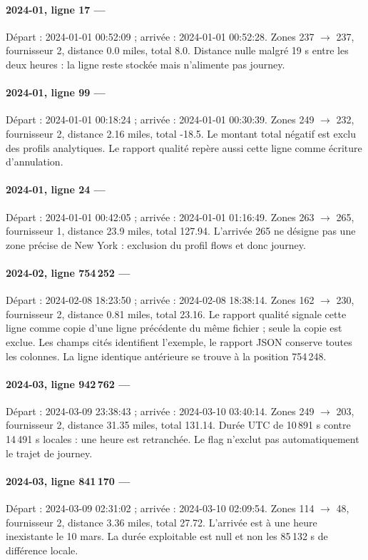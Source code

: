\paragraph{2024-01, ligne 17 --- }
Départ : 2024-01-01 00:52:09 ; arrivée : 2024-01-01 00:52:28. Zones 237 $\to$ 237, fournisseur 2, distance 0.0 miles, total 8.0.
Distance nulle malgré 19 s entre les deux heures : la ligne reste stockée mais n'alimente pas journey.

\paragraph{2024-01, ligne 99 --- }
Départ : 2024-01-01 00:18:24 ; arrivée : 2024-01-01 00:30:39. Zones 249 $\to$ 232, fournisseur 2, distance 2.16 miles, total -18.5.
Le montant total négatif est exclu des profils analytiques. Le rapport qualité repère aussi cette ligne comme écriture d'annulation.

\paragraph{2024-01, ligne 24 --- }
Départ : 2024-01-01 00:42:05 ; arrivée : 2024-01-01 01:16:49. Zones 263 $\to$ 265, fournisseur 1, distance 23.9 miles, total 127.94.
L'arrivée 265 ne désigne pas une zone précise de New York : exclusion du profil flows et donc journey.

\paragraph{2024-02, ligne 754\,252 --- }
Départ : 2024-02-08 18:23:50 ; arrivée : 2024-02-08 18:38:14. Zones 162 $\to$ 230, fournisseur 2, distance 0.81 miles, total 23.16.
Le rapport qualité signale cette ligne comme copie d'une ligne précédente du même fichier ; seule la copie est exclue. Les champs cités identifient l'exemple, le rapport JSON conserve toutes les colonnes.
La ligne identique antérieure se trouve à la position 754\,248.

\paragraph{2024-03, ligne 942\,762 --- }
Départ : 2024-03-09 23:38:43 ; arrivée : 2024-03-10 03:40:14. Zones 249 $\to$ 203, fournisseur 2, distance 31.35 miles, total 131.14.
Durée UTC de 10\,891 s contre 14\,491 s locales : une heure est retranchée. Le flag n'exclut pas automatiquement le trajet de journey.

\paragraph{2024-03, ligne 841\,170 --- }
Départ : 2024-03-09 02:31:02 ; arrivée : 2024-03-10 02:09:54. Zones 114 $\to$ 48, fournisseur 2, distance 3.36 miles, total 27.72.
L'arrivée est à une heure inexistante le 10 mars. La durée exploitable est null et non les 85\,132 s de différence locale.
